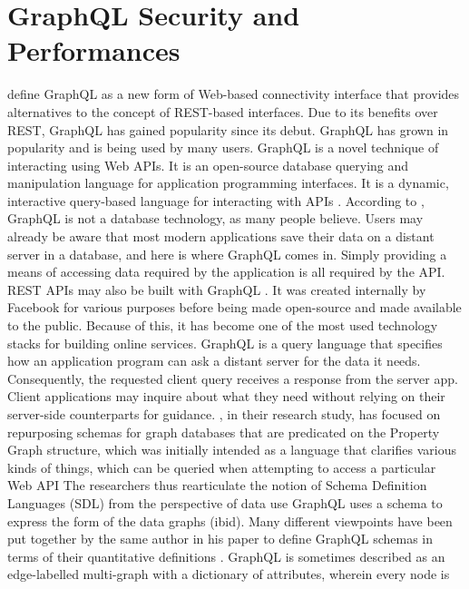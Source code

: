 \section{GraphQL Security and Performances}
\label{s:GraphQLSecurity}
\citet{hartigInitialAnalysisFacebook2017} define GraphQL as a new form of
Web-based connectivity interface that provides alternatives to the concept of
REST-based interfaces. Due to its benefits over REST, GraphQL has gained
popularity since its debut. GraphQL has grown in popularity and is being used by
many users. GraphQL is a novel technique of interacting using Web APIs. It is an
open-source database querying and manipulation language for application
programming interfaces. It is a dynamic, interactive query-based language for
interacting with APIs \citep{ eizingerAPIDesignDistributed2017}. According to
\citet{ vogelExperiencesMigratingRESTful2018}, GraphQL is not a database
technology, as many people believe. Users may already be aware that most modern
applications save their data on a distant server in a database, and here is
where GraphQL comes in. Simply providing a means of accessing data required by
the application is all required by the API. REST APIs may also be built with
GraphQL \citep{vadlamaniCanGraphQLReplace2021}. It was created internally by
Facebook for various purposes before being made open-source and made available
to the public. Because of this, it has become one of the most used technology
stacks for building online services. GraphQL is a query language that specifies
how an application program can ask a distant server for the data it needs.
Consequently, the requested client query receives a response from the server app.
Client applications may inquire about what they need without relying on their
server-side counterparts for guidance. \citet{
hartigDefiningSchemasProperty2019}, in their research study, has focused on
repurposing schemas for graph databases that are predicated on the Property
Graph structure, which was initially intended as a language that clarifies
various kinds of things, which can be queried when attempting to access a
particular Web API The researchers thus rearticulate the notion of Schema
Definition Languages (SDL) from the perspective of data use GraphQL uses a
schema to express the form of the data graphs (ibid). Many different viewpoints
have been put together by the same author in his paper to define GraphQL schemas
in terms of their quantitative definitions
\citep{hartigInitialAnalysisFacebook2017}. GraphQL is sometimes described as an
edge-labelled multi-graph with a dictionary of attributes, wherein every node is
